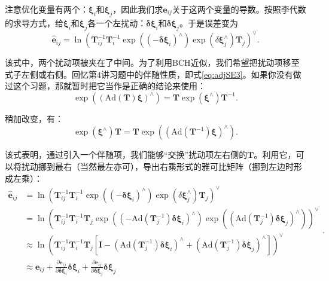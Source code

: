 注意优化变量有两个：$\bm{\xi}_i$和$\bm{\xi}_j$，因此我们求$\bm{e}_{ij}$关于这两个变量的导数。按照李代数的求导方式，给$\bm{\xi}_i$和$\bm{\xi}_j$各一个左扰动：$ \bm{\delta \xi}_i$和$ \bm{\delta \xi}_j$。于是误差变为
\begin{equation}
\hat{ \bm{e}}_{ij} = \ln \left( \bm{T}_{ij}^{-1}  \bm{T}_i^{-1} \exp((-\bm{\delta \xi}_i)^\wedge) \exp(\delta \bm{\xi}_j^\wedge) \bm{T}_j  \right)^\vee.
\end{equation}

该式中，两个扰动项被夹在了中间。为了利用BCH近似，我们希望把扰动项移至式子左侧或右侧。回忆第4讲习题中的伴随性质，即式\eqref{eq:adjSE3}。如果你没有做过这个习题，那就暂时把它当作是正确的结论来使用：
\begin{equation}
\exp \left( \left( \mathrm{Ad}(\bm{T}) \bm{\xi} \right) ^\wedge \right) = \bm{T} \exp(\bm{\xi}^\wedge)\bm{T}^{-1}.
\end{equation}

稍加改变，有：
\begin{equation}
\exp(\bm{\xi}^\wedge)\bm{T} = \bm{T} \exp \left( \left( \mathrm{Ad}(\bm{T}^{-1}) \bm{\xi} \right) ^\wedge \right) .
\end{equation}

该式表明，通过引入一个伴随项，我们能够“交换”扰动项左右侧的$\bm{T}$。利用它，可以将扰动挪到最右（当然最左亦可），导出右乘形式的雅可比矩阵（挪到左边时形成左乘）：
\begin{equation}
\begin{aligned}
\hat{ \bm{e}}_{ij} &= \ln \left( \bm{T}_{ij}^{-1}  \bm{T}_i^{-1} \exp((-\bm{\delta \xi}_i)^\wedge) \exp(\delta \bm{\xi}_j^\wedge) \bm{T}_j  \right)^\vee\\
&= \ln \left( \bm{T}_{ij}^{-1} \bm{T}_i^{-1} \bm{T}_j \exp \left( \left(- \mathrm{Ad}(\bm{T}_j^{-1}) \bm{\delta \xi}_i \right)^\wedge \right) \exp \left( \left( \mathrm{Ad}(\bm{T}_j^{-1})  \bm{\delta\xi}_j\right)^\wedge \right) \right)^\vee \\ 
&\approx \ln \left( \bm{T}_{ij}^{-1} \bm{T}_i^{-1} \bm{T}_j \left[ \bm{I} - (\mathrm{Ad}(\bm{T}_j^{-1}) \bm{\delta \xi}_i)^\wedge + (\mathrm{Ad}(\bm{T}_j^{-1})  \bm{\delta \xi}_j)^{\wedge} \right] \right)^\vee \\
& \approx \bm{e}_{ij} + \frac{\partial \bm{e}_{ij}}{\partial \bm{\delta \xi}_i} \bm{\delta \xi}_i + \frac{\partial \bm{e}_{ij}}{\partial \bm{\delta \xi}_j} \bm{\delta \xi}_j
\end{aligned}.
\end{equation}

